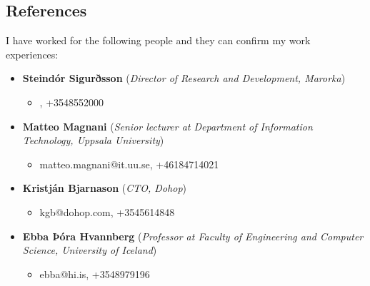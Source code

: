 \documentclass[10pt]{article}
\begin{document}
\begin{flushleft}
\section*{References}
I have worked for the following people and they can confirm my work experiences: \newline

\begin{itemize}
  \item \textbf{Steindór Sigurðsson} (\textit{Director of Research and Development, Marorka})
  \begin{itemize}
  \item <email currently unknown>, +3548552000 
  \end{itemize}
  \item \textbf{Matteo Magnani} (\textit{Senior lecturer at Department of Information Technology, Uppsala University})
  \begin{itemize}
  \item matteo.magnani@it.uu.se, +46184714021
  \end{itemize}
  \item \textbf{Kristján Bjarnason} (\textit{CTO, Dohop})
  \begin{itemize}
  \item kgb@dohop.com, +3545614848
  \end{itemize}
  \item \textbf{Ebba Þóra Hvannberg} (\textit{Professor at Faculty of Engineering and Computer Science, University of Iceland})
  \begin{itemize}
  \item ebba@hi.is, +3548979196
  \end{itemize}
\end{itemize}


\end{flushleft}
\end{document}
